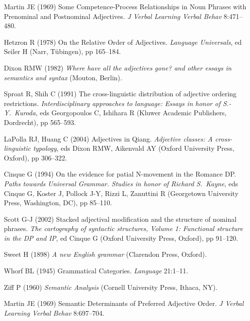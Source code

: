 \documentclass{pnastwo}
\begin{document}
\begin{article}

\begin{thebibliography}{10}

	Martin JE (1969) Some Competence-Process Relationships in Noun Phrases with Prenominal and Postnominal Adjectives. \emph{J Verbal Learning Verbal Behav} 8:471--480. 	
	
	Hetzron R (1978) On the Relative Order of Adjectives. \emph{Language Universals}, ed Seiler H (Narr, T\"{u}bingen), pp 165--184.
	
	Dixon RMW (1982) \emph{Where have all the adjectives gone? and other essays in semantics and syntax} (Mouton, Berlin).
	
	Sproat R, Shih C (1991) The cross-linguistic distribution of adjective ordering restrictions. \emph{Interdisciplinary approaches to language: Essays in honor of S.-Y.~Kuroda}, eds 
	Georgopoulos C, Ishihara R (Kluwer Academic Publishers, Dordrecht), pp 565--593.

	LaPolla RJ, Huang C (2004) Adjectives in Qiang. \emph{Adjective classes: A cross-linguistic typology}, eds Dixon RMW, Aikenvald AY (Oxford University Press, Oxford), pp 306--322.

	Cinque G (1994) On the evidence for patial N-movement in the Romance DP. \emph{Paths towards Universal Grammar. Studies in honor of Richard S.~Kayne}, eds Cinque G, Koster J, Pollock J-Y, Rizzi L, Zanuttini R (Georgetown University Press, Washington, DC), pp 85--110.

	Scott G-J (2002) Stacked adjectival modification and the structure of nominal phrases. \emph{The cartography of syntactic structures, Volume 1: Functional structure in the DP and IP}, ed Cinque G (Oxford University Press, Oxford), pp 91--120.

	Sweet H (1898) \emph{A new English grammar} (Clarendon Press, Oxford).
		
		
	Whorf BL (1945) Grammatical Categories. \emph{Language} 21:1--11. 
	
	Ziff P (1960) \emph{Semantic Analysis} (Cornell University Press, Ithaca, NY).
		
				
	Martin JE (1969) Semantic Determinants of Preferred Adjective Order. \emph{J Verbal Learning Verbal Behav} 8:697--704. 	
	

\end{thebibliography}
\end{article}
\end{document}
